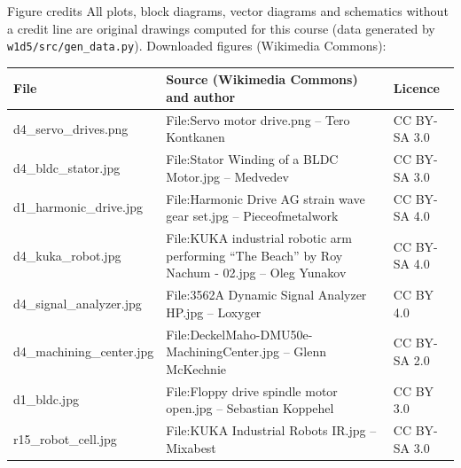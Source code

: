 \documentclass[aspectratio=169,10pt]{beamer}
\begin{document}
\begin{frame}[t]{Figure credits}
\scriptsize
All plots, block diagrams, vector diagrams and schematics without a credit line are original drawings computed for this course
(data generated by \texttt{w1d5/src/gen\_data.py}). Downloaded figures (Wikimedia Commons):\\[2mm]
\begin{tabularx}{\linewidth}{@{}l X l@{}}
\toprule
\textbf{File} & \textbf{Source (Wikimedia Commons) and author} & \textbf{Licence}\\
\midrule
d4\_servo\_drives.png & File:Servo motor drive.png -- Tero Kontkanen & CC BY-SA 3.0\\
d4\_bldc\_stator.jpg & File:Stator Winding of a BLDC Motor.jpg -- Medvedev & CC BY-SA 3.0\\
d1\_harmonic\_drive.jpg & File:Harmonic Drive AG strain wave gear set.jpg -- Pieceofmetalwork & CC BY-SA 4.0\\
d4\_kuka\_robot.jpg & File:KUKA industrial robotic arm performing ``The Beach'' by Roy Nachum - 02.jpg -- Oleg Yunakov & CC BY-SA 4.0\\
d4\_signal\_analyzer.jpg & File:3562A Dynamic Signal Analyzer HP.jpg -- Loxyger & CC BY 4.0\\
d4\_machining\_center.jpg & File:DeckelMaho-DMU50e-MachiningCenter.jpg -- Glenn McKechnie & CC BY-SA 2.0\\
d1\_bldc.jpg & File:Floppy drive spindle motor open.jpg -- Sebastian Koppehel & CC BY 3.0\\
r15\_robot\_cell.jpg & File:KUKA Industrial Robots IR.jpg -- Mixabest & CC BY-SA 3.0\\
\bottomrule
\end{tabularx}
\end{frame}
\end{document}
